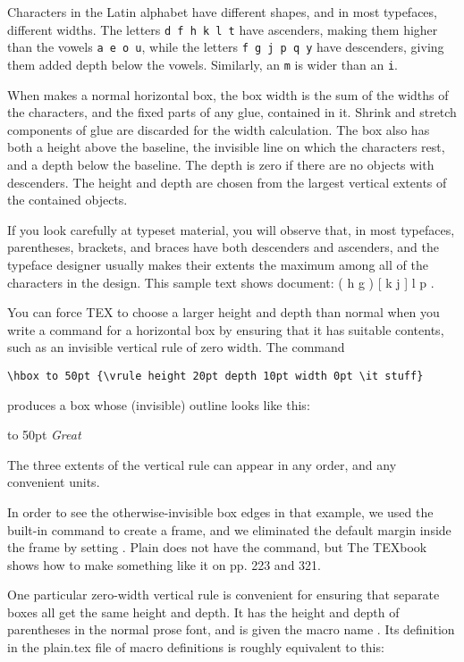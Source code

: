 {Characters in the Latin alphabet have different shapes, and in most typefaces,
different widths. The letters \texttt{d f h k l t} have ascenders, making them
higher than the vowels \texttt{a e o u}, while the letters \texttt{f g j p q y} have descenders,
giving them added depth below the vowels. Similarly, an \texttt{m} is wider than
an \texttt{i}. 


When \tex makes a normal horizontal box, the box width is the sum
of the widths of the characters, and the fixed parts of any glue, contained
in it. Shrink and stretch components of glue are discarded for the width
calculation. The box also has both a height above the baseline, the invisible
line on which the characters rest, and a depth below the baseline. The
depth is zero if there are no objects with descenders. The height and depth
are chosen from the largest vertical extents of the contained objects.

If you look carefully at typeset material, you will observe that, in most
typefaces, parentheses, brackets, and braces have both descenders and ascenders,
and the typeface designer usually makes their extents the maximum
among all of the characters in the design. This sample text shows
document: ( h g ) [ k j ] { l p }.

You can force TEX to choose a larger height and depth than normal when
you write a command for a horizontal box by ensuring that it has suitable
contents, such as an invisible vertical rule of zero width. The command

\verb+\hbox to 50pt {\vrule height 20pt depth 10pt width 0pt \it stuff}+

produces a box whose (invisible) outline looks like this: 

\hbox to 50pt {\vrule height 20pt depth 10pt width 0pt \it Great}


The
three extents of the vertical rule can appear in any order, and any convenient
units.

In order to see the otherwise-invisible box edges in that example, we
used the \latex  built-in command  to create a frame, and we eliminated
the default margin inside the frame by setting . Plain \tex
does not have the  command, but The TEXbook shows how to make
something like it on pp. 223 and 321.

One particular zero-width vertical rule is convenient for ensuring that
separate boxes all get the same height and depth. It has the height and
depth of parentheses in the normal prose font, and is given the macro name .
Its definition in the plain.tex file of macro definitions is roughly
equivalent to this:

}
